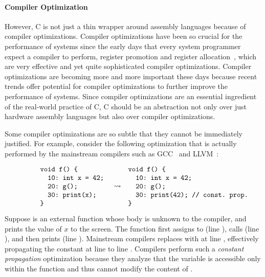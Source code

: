 \paragraph{Compiler Optimization}

However, C is not just a thin wrapper around assembly languages because of compiler optimizations.
Compiler optimizations have been so crucial for the performance of systems since the early days that
every system programmer expect a compiler to perform, \eg{} register promotion and register
allocation~\cite{reg-prom, reg-alloc}, which are very effective and yet quite sophisticated compiler
optimizations.  Compiler optimizations are becoming more and more important these days because
recent trends offer potential for compiler optimizations to further improve the performance of
systems.  Since compiler optimizations are an essential ingredient of the real-world practice of C,
C should be an abstraction not only over just hardware assembly languages but also over compiler
optimizations.



Some compiler optimizations are so subtle that they cannot be immediately justified.  For example,
consider the following optimization that is actually performed by the mainstream compilers such as
GCC~\cite{gcc} and LLVM~\cite{llvm}:

\[\begin{array}{rcl}
\begin{minipage}{0.27\textwidth}
\begin{verbatim}
void f() {
  10: int x = 42;
  20: g();
  30: print(x);
}
\end{verbatim}
\end{minipage}
&
\optarrow
&
\begin{minipage}{0.4\textwidth}
\begin{verbatim}
void f() {
  10: int x = 42;
  20: g();
  30: print(42); // const. prop.
}
\end{verbatim}
\end{minipage}
\end{array}\]

\noindent Suppose  is an external function whose body is unknown to the compiler, and
 prints the value of $x$ to the screen.  The function  first assigns
 to  (line ), calls  (line ), and then prints 
(line ).  Mainstream compilers replaces  with  at line ,
effectively propagating the constant  at line  to line .  Compilers
perform such a \emph{constant propagation} optimization because they analyze that the variable
 is accessible only within the function  and thus  cannot modify the
content of .

